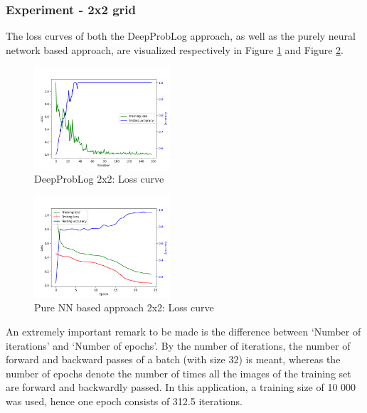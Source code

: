 \documentclass[english]{sobraep}
\begin{document}
\subsubsection{Experiment - 2x2 grid}
The loss curves of both the DeepProbLog approach, as well as the purely neural network based approach, are visualized respectively in Figure \ref{fig:loss_curve_deepproblog_2x2} and Figure \ref{fig:loss_curve_pure_NN_2x2}.

\begin{figure}[htp]
    \begin{center}
    \includegraphics[width=0.45\textwidth]{loss_curve_deepproblog_2x2.png} 
    \captionsetup{justification=centering}
    \caption{DeepProbLog 2x2: Loss curve}
    \label{fig:loss_curve_deepproblog_2x2}
    \end{center}
\end{figure}

\begin{figure}[htp]
    \begin{center}
    \includegraphics[width=0.45\textwidth]{loss_curve_pure_NN_2x2.png} 
    \captionsetup{justification=centering}
    \caption{Pure NN based approach 2x2: Loss curve}
    \label{fig:loss_curve_pure_NN_2x2}
    \end{center}
\end{figure}
An extremely important remark to be made is the difference between `Number of iterations' and `Number of epochs'. By the number of iterations, the number of forward and backward passes of a batch (with size 32) is meant, whereas the number of epochs denote the number of times all the images of the training set are forward and backwardly passed. In this application, a training size of 10 000 was used, hence one epoch consists of 312.5 iterations.
\end{document}
